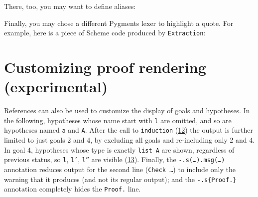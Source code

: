 \documentclass[a4paper]{article}
\begin{document}
There, too, you may want to define aliases:

\begin{quote}
\begin{alectryon}
\end{alectryon}

\begin{alectryon}
\end{alectryon}
\end{quote}

Finally, you may chose a different Pygments lexer to highlight a quote.  For example, here is a piece of Scheme code produced by \texttt{Extraction}:

\begin{quote}
\begin{alectryon}
  \begin{\al{message}}
  \end{\al{message}}
\end{alectryon}
\end{quote}


\section{Customizing proof rendering (\textbf{experimental})%
  \label{customizing-proof-rendering-experimental}%
}

References can also be used to customize the display of goals and hypotheses.  In the following, hypotheses whose name start with \texttt{l} are omitted, and so are hypotheses named \texttt{a} and \texttt{A}.  After the call to \texttt{induction} (\hyperref[references-rst-io-pr-s-induction-1-0]{12}) the output is further limited to just goals 2 and 4, by excluding all goals and re-including only 2 and 4.  In goal 4, hypotheses whose type is exactly \texttt{list A} are shown, regardless of previous status, so \texttt{l}, \texttt{l'}, \texttt{l''} are visible (\hyperref[references-rst-io-pr-s-induction-1-g-4-h-l-0]{13}).  Finally, the \texttt{-.s(…).msg(…)} annotation reduces output for the second line (\texttt{Check …}) to include only the warning that it produces (and not its regular output); and the \texttt{-.s\{Proof.\}} annotation completely hides the \texttt{Proof.} line.
\end{document}
